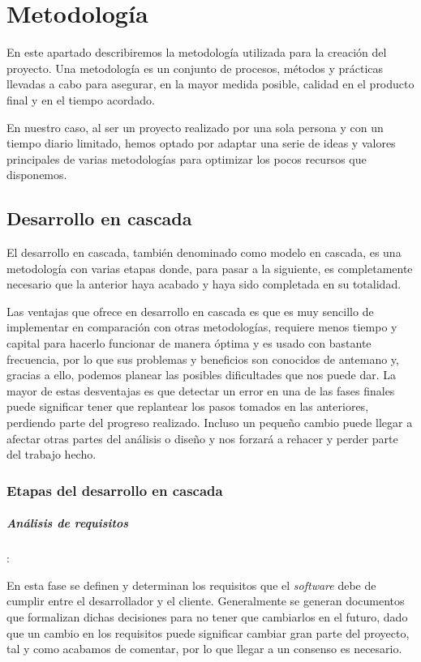 \chapter{Metodología}

En este apartado describiremos la metodología utilizada para la creación del proyecto. Una metodología es un conjunto de procesos, métodos y prácticas llevadas a cabo para asegurar, en la mayor medida posible, calidad en el producto final y en el tiempo acordado.

En nuestro caso, al ser un proyecto realizado por una sola persona y con un tiempo diario limitado, hemos optado por adaptar una serie de ideas y valores principales de varias metodologías para optimizar los pocos recursos que disponemos.

\section{Desarrollo en cascada}

El desarrollo en cascada, también denominado como modelo en cascada, es una metodología con varias etapas donde, para pasar a la siguiente, es completamente necesario que la anterior haya acabado y haya sido completada en su totalidad.

Las ventajas que ofrece en desarrollo en cascada es que es muy sencillo de implementar en comparación con otras metodologías, requiere menos tiempo y capital para hacerlo funcionar de manera óptima y es usado con bastante frecuencia, por lo que sus problemas y beneficios son conocidos de antemano y, gracias a ello, podemos planear las posibles dificultades que nos puede dar. La mayor de estas desventajas es que detectar un error en una de las fases finales puede significar tener que replantear los pasos tomados en las anteriores, perdiendo parte del progreso realizado. Incluso un pequeño cambio puede llegar a afectar otras partes del análisis o diseño y nos forzará a rehacer y perder parte del trabajo hecho. 

\subsection{Etapas del desarrollo en cascada}

\paragraph{Análisis de requisitos}: 

En esta fase se definen y determinan los requisitos que el \textit{software} debe de cumplir entre el desarrollador y el cliente. Generalmente se generan documentos que formalizan dichas decisiones para no tener que cambiarlos en el futuro, dado que un cambio en los requisitos puede significar cambiar gran parte del proyecto, tal y como acabamos de comentar, por lo que llegar a un consenso es necesario.

